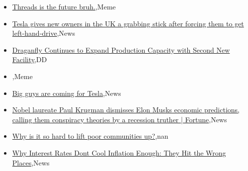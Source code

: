 \documentclass{article}%
\begin{document}
%
\begin{itemize}%
\item%
\href{https://reddit.com/r/wallstreetbets/comments/14syarl/threads\_is\_the\_future\_bruh/}{Threads is the future bruh.},Meme%
\item%
\href{https://reddit.com/r/wallstreetbets/comments/14sx850/tesla\_gives\_new\_owners\_in\_the\_uk\_a\_grabbing\_stick/}{Tesla gives new owners in the UK a grabbing stick after forcing them to get left-hand-drive},News%
\item%
\href{https://reddit.com/r/Baystreetbets/comments/14sz4p5/draganfly\_continues\_to\_expand\_production\_capacity/}{Draganfly Continues to Expand Production Capacity with Second New Facility},DD%
\item%
\href{https://reddit.com/r/StockMarket/comments/14swhvj/\_/}{},Meme%
\item%
\href{https://reddit.com/r/StockMarket/comments/14smkue/big\_guys\_are\_coming\_for\_tesla/}{Big guys are coming for Tesla},News%
\item%
\href{https://reddit.com/r/StockMarket/comments/14sjbyr/nobel\_laureate\_paul\_krugman\_dismisses\_elon\_musks/}{Nobel laureate Paul Krugman dismisses Elon Musks economic predictions, calling them conspiracy theories by a recession truther | Fortune},News%
\item%
\href{https://reddit.com/r/Economics/comments/14sm11a/why\_is\_it\_so\_hard\_to\_lift\_poor\_communities\_up/}{Why is it so hard to lift poor communities up?},nan%
\item%
\href{https://reddit.com/r/Economics/comments/14skgzp/why\_interest\_rates\_dont\_cool\_inflation\_enough/}{Why Interest Rates Dont Cool Inflation Enough: They Hit the Wrong Places},News%
\end{itemize}%
\end{document}
